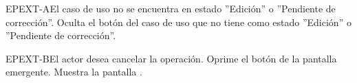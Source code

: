 	\begin{UCtrayectoriaA}{EPEXT-A}{El caso de uso no se encuentra en estado ''Edición'' o ''Pendiente de corrección''.}
		\UCpaso[\UCsist] Oculta el botón  del caso de uso que no tiene como estado ''Edición'' o ''Pendiente de corrección''.
	\end{UCtrayectoriaA}

	\begin{UCtrayectoriaA}{EPEXT-B}{El actor desea cancelar la operación.}
		\UCpaso[\UCactor] Oprime el botón  de la pantalla emergente.
		\UCpaso[\UCsist] Muestra la pantalla .
	\end{UCtrayectoriaA}
	


